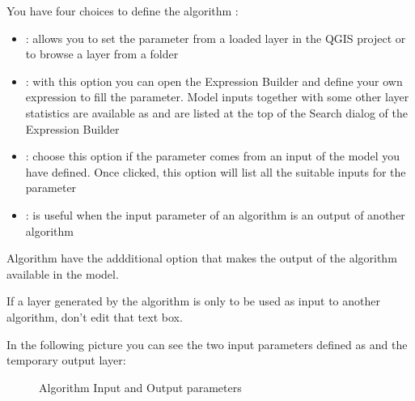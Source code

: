 \documentclass[letterpaper,10pt,english]{sphinxmanual}
\begin{document}
\sphinxAtStartPar
You have four choices to define the algorithm :
\begin{itemize}
\item {} 
\sphinxAtStartPar
{} : allows you to set the parameter from a loaded
layer in the QGIS project or to browse a layer from a folder

\item {} 
\sphinxAtStartPar
{} : with this option you can open the
Expression Builder and define your own expression to fill the parameter. Model
inputs together with some other layer statistics are available as 
and are listed at the top of the Search dialog of the Expression Builder

\item {} 
\sphinxAtStartPar
{} : choose this option if the
parameter comes from an input of the model you have defined. Once clicked, this
option will list all the suitable inputs for the parameter

\item {} 
\sphinxAtStartPar
{} : is useful when the input
parameter of an algorithm is an output of another algorithm

\end{itemize}

\sphinxAtStartPar
Algorithm  have the addditional  
option that makes the output of the algorithm available in the model.

\sphinxAtStartPar
If a layer generated by the algorithm is only to be used as input to another
algorithm,  don’t edit that text box.

\sphinxAtStartPar
In the following picture you can see the two input parameters defined as
 and the temporary output layer:

\begin{figure}[H]
\centering
\capstart

\noindent{}
\caption{Algorithm Input and Output parameters}\label{\detokenize{Introduction/models:id6}}\end{figure}
\end{document}
